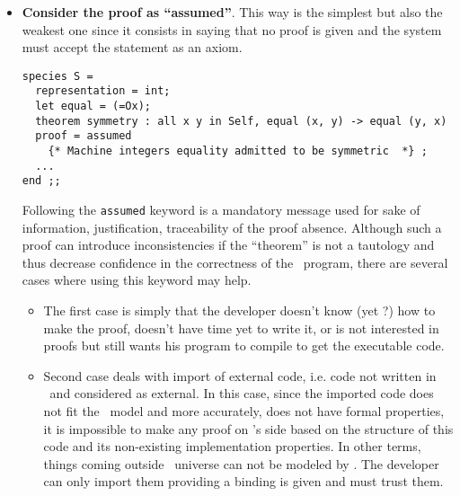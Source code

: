 \begin{itemize}
\item {\bf Consider the proof as ``assumed''}. This way is the
  simplest but also the weakest one since it consists in saying that
  no proof is given and the system must accept the statement as an axiom.
  {\scriptsize
\begin{lstlisting}
species S =
  representation = int;
  let equal = (=Ox);
  theorem symmetry : all x y in Self, equal (x, y) -> equal (y, x)
  proof = assumed
    {* Machine integers equality admitted to be symmetric  *} ;
  ...
end ;;
\end{lstlisting}
}

 Following the {\tt assumed} keyword is a mandatory message used for
sake of information, justification, traceability of the proof
absence. Although such a proof can introduce inconsistencies if the
``theorem'' is not a tautology and thus decrease confidence in the
correctness of the \focal\ program, there are several cases where
using this keyword may help.
  \begin{itemize}
      \item The first case is simply that the developer doesn't know
        (yet ?) how to make the proof, doesn't have time yet to write
        it, or is not interested in proofs but still wants his program to
        compile to get the executable code.

      \item Second case deals with import of external code, i.e. code
        not written in \focal\ and considered as external. In this
        case, since the imported code does not fit the \focal\ model
        and more accurately, does not have formal properties, it is
        impossible to make any proof on \focal's side based on the
        structure of this code and its non-existing implementation
        properties. In other terms, things coming outside \focal\
        universe can not be modeled by \focal. The developer can only
        import them providing a binding is given and must trust them.


\end{itemize}
\end{itemize}
